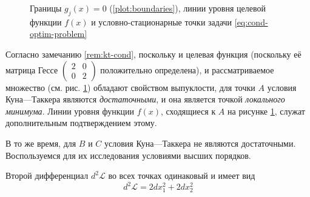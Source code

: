 \documentclass{article}
\providecommand{\La}{\mathcal{L}}
\theoremstyle{remark}
\theoremstyle{definition}
\numberwithin{equation}{section}
\begin{document}
\begin{figure}[!h]
  \centering
  \caption{Границы $g_j(x)=0$ (\ref{plot:boundaries}), линии уровня
    целевой функции $f(x)$ и условно-стационарные точки задачи
    \eqref{eq:cond-optim-problem}}
  \label{fig:cond-optim}
\end{figure}

Согласно замечанию \ref{rem:kt-cond}, поскольку и целевая функция
(поскольку её матрица Гессе $\left( \begin{smallmatrix}2 & 0 \\ 0 &
    2\end{smallmatrix} \right)$ положительно определена), и
рассматриваемое множество (см. рис. \ref{fig:cond-optim}) обладают
свойством выпуклости, для точки $A$ условия Куна—Таккера являются
\emph{достаточными}, и она является точкой \emph{локального минимума}.
Линии уровня функции $f(x)$, сходящиеся к $A$ на рисунке
\ref{fig:cond-optim}, служат дополнительным подтверждением этому.

В то же время, для $B$ и $C$ условия Куна—Таккера не являются
достаточными. Воспользуемся для их исследования условиями высших
порядков.

Второй дифференциал $d^2\La$ во всех точках одинаковый и имеет вид
\begin{equation}
  \label{eq:la-diff}
  d^2\La = 2dx_1^2 + 2 dx_2^2
\end{equation}
\end{document}
